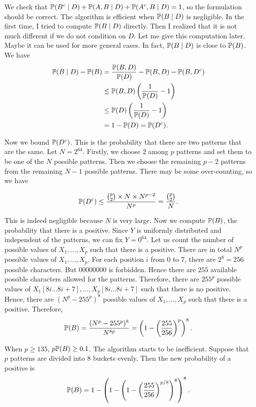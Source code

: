 We check that $\mathbb{P}(B^c\mid D)+\mathbb{P}(A,B\mid D)+\mathbb{P}(A^c,B\mid D)=1$, so the formulation should be correct. The algorithm is efficient when $\mathbb{P}(B\mid D)$ is negligible. In the first time, I tried to compute $\mathbb{P}(B\mid D)$ directly. Then I realized that it is not much different if we do not condition on $D$. Let me give this computation later. Maybe it can be used for more general cases. In fact, $\mathbb{P}(B\mid D)$ is close to $\mathbb{P}(B)$. We have
\begin{align*}
  \mathbb{P}(B\mid D) - \mathbb{P}(B)
   & = \dfrac{\mathbb{P}(B,D)}{\mathbb{P}(D)} - \mathbb{P}(B,D) - \mathbb{P}(B,D^c) \\
   & \le \mathbb{P}(B,D)\left(\dfrac{1}{\mathbb{P}(D)}-1\right)       \\
   & \le \mathbb{P}(D)\left(\dfrac{1}{\mathbb{P}(D)}-1\right)         \\
   & = 1-\mathbb{P}(D) = \mathbb{P}(D^c).
\end{align*}

Now we bound $\mathbb{P}(D^c)$. This is the probability that there are two patterns that are the same. Let $N=2^{64}$. Firstly, we choose $2$ among $p$ patterns and set them to be one of the $N$ possible patterns. Then we choose the remaining $p-2$ patterns from the remaining $N-1$ possible patterns. There may be some over-counting, so we have

$$\mathbb{P}(D^c)\le \dfrac{\binom{p}{2}\times N\times N^{p-2}}{N^p} = \dfrac{\binom{p}{2}}{N}.$$

This is indeed negligible because $N$ is very large. Now we compute $\mathbb{P}(B)$, the probability that there is a positive. Since $Y$ is uniformly distributed and independent of the patterns, we can fix $Y=0^{64}$. Let us count the number of possible values of $X_1,\ldots,X_p$ such that there is a positive. There are in total $N^p$ possible values of $X_1,\ldots,X_p$. For each position $i$ from $0$ to $7$, there are $2^8=256$ possible characters. But $00000000$ is forbidden. Hence there are $255$ available possible characters allowed for the patterns. Therefore, there are $255^p$ possible values of $X_1[8i\ldots 8i+7],\ldots,X_p[8i\ldots 8i+7]$ such that there is no positive. Hence, there are $(N^p-255^p)^8$ possible values of $X_1,\ldots,X_p$ such that there is a positive. Therefore,
$$\mathbb{P}(B) = \dfrac{(N^p-255^p)^8}{N^{8p}} = \left(1-\left(\dfrac{255}{256}\right)^p\right)^8.$$

When $p\ge 135$, $p\mathbb{P}(B)\ge 0.1$. The algorithm starts to be inefficient. Suppose that $p$ patterns are divided into $8$ buckets evenly. Then the new probability of a positive is
$$\mathbb{P}(B)=1-\left(1-\left(1-\left(\dfrac{255}{256}\right)^{p/8}\right)^8\right)^8.$$

